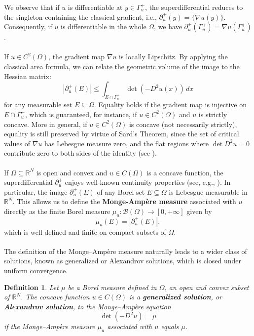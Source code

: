 \documentclass{article}
\newtheorem{definition}[theorem]{Definition}
\numberwithin{equation}{section}
\begin{document}
 
\noindent We observe that if $u$ is differentiable at $y \in \Gamma_u^+$, the superdifferential reduces to the singleton containing the classical gradient, i.e., $\partial^+_u(y)=\{\nabla u(y)\}$. Consequently, if $u$ is differentiable in the whole $\Omega$, we have $\partial^+_u(\Gamma_u^+) = \nabla u(\Gamma_u^+)$.
\\ \\
\noindent If $u \in C^{2}(\Omega)$, the gradient map $\nabla u$ is locally Lipschitz. By applying the classical area formula, we can relate the geometric volume of the image to the Hessian matrix:
    \begin{equation}\label{eq:area}
    |\partial^+_u(E)| \leq \int_{E \cap \Gamma_u^+} \det(-D^2 u(x)) \, dx
    \end{equation}
    for any measurable set $E \subseteq \Omega$. Equality holds if the gradient map is injective on $E \cap \Gamma_u^+$, which is guaranteed, for instance, if $u \in C^2(\Omega)$ and $u$ is strictly concave. More in general, if $u \in C^2(\Omega)$ is concave (not necessarily strictly), equality is still preserved by virtue of Sard's Theorem, since the set of critical values of $\nabla u$ has Lebesgue measure zero, and the flat regions where $\det D^2 u = 0$ contribute zero to both sides of the identity (see \cite{gutierrez2016}). 
    \\ \\
    \noindent  If $\Omega \subseteq \mathbb{R}^N$ is open and convex and $u \in C(\Omega)$ is a concave function, the superdifferential $\partial^+_u$ enjoys well-known continuity properties (see, e.g., \cite{gutierrez2016}).
   In particular, the image $\partial^+_u(E)$ of any Borel set $E \subseteq \Omega$ is Lebesgue measurable in $\mathbb{R}^N$. This allows us to define the \textbf{Monge-Ampère measure} associated with $u$ directly as the finite Borel measure $\mu_u : \mathcal{B}(\Omega) \longrightarrow [0, +\infty]$ given by
\begin{equation}\label{def:Monge}
\mu_u(E) = |\partial^+_u(E)|,
\end{equation}
which is well-defined and finite on compact subsets of $\Omega$.
\\ \\
The definition of the Monge–Ampère measure naturally leads to a wider class of solutions, known as generalized or Alexandrov solutions, which is closed under uniform convergence.
\begin{definition}
    Let $\mu$ be a Borel measure defined in $\Omega$, an open and convex subset 
of $\mathbb{R}^N$. The concave function $u \in C(\Omega)$ is a \textbf{generalized 
solution}, or \textbf{Alexandrov solution}, to the Monge–Ampère equation
$$\det (-D^2u) = \mu$$
if the Monge–Ampère measure $\mu_u$ associated with $u$ equals $\mu$.
\end{definition}
\end{document}

